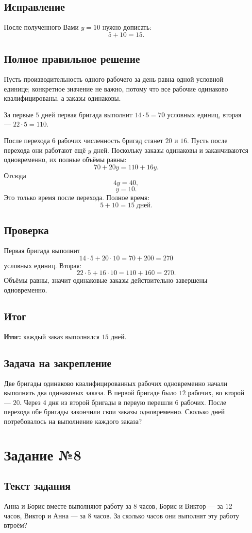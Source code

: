 \documentclass[12pt,a4paper]{article}
\newcommand{\result}{\textcolor{teal!60!black}{\textbf{Итог:}}}
\newcommand{\tasksection}[1]{\section*{Задание №#1}}
\begin{document}
\subsection*{Исправление}
После полученного Вами $y=10$ нужно дописать:
\[
5+10=15.
\]

\subsection*{Полное правильное решение}
Пусть производительность одного рабочего за день равна одной условной единице; конкретное значение не важно, потому что все рабочие одинаково квалифицированы, а заказы одинаковы.

За первые $5$ дней первая бригада выполнит $14\cdot5=70$ условных единиц, вторая --- $22\cdot5=110$.

После перехода $6$ рабочих численность бригад станет $20$ и $16$. Пусть после перехода они работают ещё $y$ дней. Поскольку заказы одинаковы и заканчиваются одновременно, их полные объёмы равны:
\[
70+20y=110+16y.
\]
Отсюда
\[
4y=40,
\]
\[
y=10.
\]
Это только время после перехода. Полное время:
\[
5+10=15 \text{ дней}.
\]

\subsection*{Проверка}
Первая бригада выполнит
\[
14\cdot5+20\cdot10=70+200=270
\]
условных единиц. Вторая:
\[
22\cdot5+16\cdot10=110+160=270.
\]
Объёмы равны, значит одинаковые заказы действительно завершены одновременно.

\subsection*{Итог}
\result{} каждый заказ выполнялся $15$ дней.

\subsection*{Задача на закрепление}
Две бригады одинаково квалифицированных рабочих одновременно начали выполнять два одинаковых заказа. В первой бригаде было $12$ рабочих, во второй --- $20$. Через $4$ дня из второй бригады в первую перешли $6$ рабочих. После перехода обе бригады закончили свои заказы одновременно. Сколько дней потребовалось на выполнение каждого заказа?

\newpage
{}\label{task:8}
\tasksection{8}
\subsection*{Текст задания}
Анна и Борис вместе выполняют работу за $8$ часов, Борис и Виктор --- за $12$ часов, Виктор и Анна --- за $8$ часов. За сколько часов они выполнят эту работу втроём?
\end{document}

